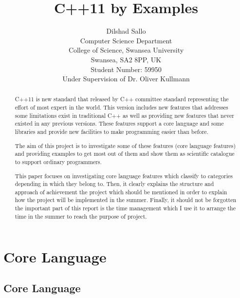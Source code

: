 \documentclass[11pt]{report}
\begin{document}
\author{Dilshad Sallo\\[1ex]
  Computer Science Department\\
  College of Science, Swansea University\\
  Swansea, SA2 8PP, UK\\[1ex]
  Student Number: 59950\\
  Under Supervision of Dr. Oliver Kullmann
}

\title{C++11 by Examples}

\maketitle



\begin{abstract}

C++11 is new standard that released by C++ committee standard representing the effort of most expert in the world. This version includes new features that addresses some limitations exist in traditional C++ as well as providing new features that never existed in any previous versions. These features support a core language and some libraries and  provide new facilities  to make programming easier than before.

The aim of this project is to investigate some of these features (core \linebreak language features) and providing examples to get most out of them and show them as scientific catalogue to support  ordinary programmers.

This paper focuses on investigating core language features which classify to categories depending in which they belong to. Then, it clearly explains the structure  and  approach of achievement the project which should be mentioned in order to explain how the project will be implemented in the  summer. Finally, it should not be forgotten the important part of this report is the time management which  I use it to arrange the time in the summer to reach the purpose of project.
\end{abstract}

\tableofcontents

\chapter{Core Language}

\section{Core Language}
\label{section: core language}
\end{document}
